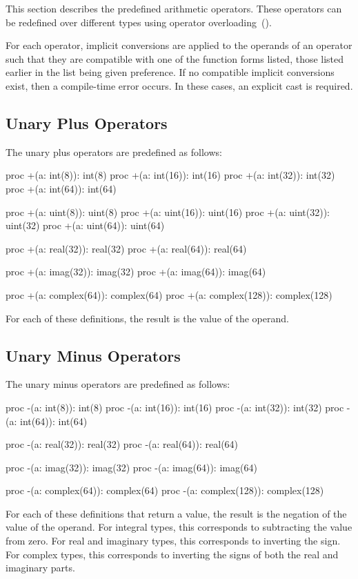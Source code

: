 This section describes the predefined arithmetic operators.  These
operators can be redefined over different types using operator
overloading~().

For each operator, implicit conversions are applied to the operands of
an operator such that they are compatible with one of the function
forms listed, those listed earlier in the list being given
preference.  If no compatible implicit conversions exist, then a
compile-time error occurs.  In these cases, an explicit cast is required.

\pagebreak
\subsection{Unary Plus Operators}
\label{Unary_Plus_Operators}

The unary plus operators are predefined as follows:
\begin{chapel}
proc +(a: int(8)): int(8)
proc +(a: int(16)): int(16)
proc +(a: int(32)): int(32)
proc +(a: int(64)): int(64)

proc +(a: uint(8)): uint(8)
proc +(a: uint(16)): uint(16)
proc +(a: uint(32)): uint(32)
proc +(a: uint(64)): uint(64)

proc +(a: real(32)): real(32)
proc +(a: real(64)): real(64)

proc +(a: imag(32)): imag(32)
proc +(a: imag(64)): imag(64)

proc +(a: complex(64)): complex(64)
proc +(a: complex(128)): complex(128)
\end{chapel}
For each of these definitions, the result is the value of the operand.

\subsection{Unary Minus Operators}
\label{Unary_Minus_Operators}

The unary minus operators are predefined as follows:
\begin{chapel}
proc -(a: int(8)): int(8)
proc -(a: int(16)): int(16)
proc -(a: int(32)): int(32)
proc -(a: int(64)): int(64)

proc -(a: real(32)): real(32)
proc -(a: real(64)): real(64)

proc -(a: imag(32)): imag(32)
proc -(a: imag(64)): imag(64)

proc -(a: complex(64)): complex(64)
proc -(a: complex(128)): complex(128)
\end{chapel}
For each of these definitions that return a value, the result is the
negation of the value of the operand.  For integral types, this
corresponds to subtracting the value from zero.  For real and
imaginary types, this corresponds to inverting the sign.  For complex
types, this corresponds to inverting the signs of both the real and
imaginary parts.

